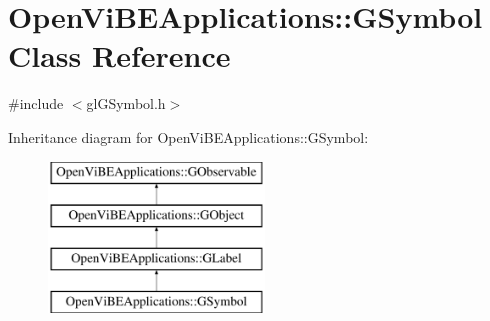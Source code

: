 \hypertarget{classOpenViBEApplications_1_1GSymbol}{
\section{OpenViBEApplications::GSymbol Class Reference}
\label{classOpenViBEApplications_1_1GSymbol}
}


{\ttfamily \#include $<$glGSymbol.h$>$}

Inheritance diagram for OpenViBEApplications::GSymbol:\begin{figure}[H]
\begin{center}
\leavevmode
\includegraphics[height=4.000000cm]{classOpenViBEApplications_1_1GSymbol}
\end{center}
\end{figure}
